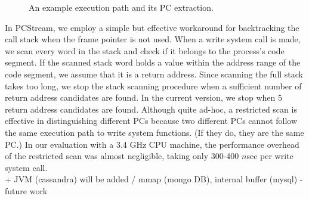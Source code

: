 \begin{figure}[b]
	\centering
	\hfill
	\caption{An example execution path and its PC extraction.} %
	\label{fig:getpc}
\end{figure}

In \textsf{\small PCStream}, we employ a simple but effective workaround 
for backtracking the call stack when the frame pointer is not used.
When a write system call is made, we scan every word in the stack and check
if it belongs to the process's code segment.  If the scanned stack word holds a
value within the address range of the code segment, we assume that it is a
return address.  Since scanning the full stack takes too long, we stop the
stack scanning procedure when a sufficient number of return address candidates
are found.  In the current version, we stop when 5 return address candidates
are found.  Although quite ad-hoc, a restricted scan is effective in
distinguishing different PCs because two different PCs
cannot follow the same execution path to write system functions.  
(If they do, they are the same PC.) In our evaluation
with a 3.4 GHz CPU machine, the performance overhead of the restricted scan was
almost negligible, taking only 300-400 $n$sec per write system call.
\\
+ JVM (cassandra) will be added /  mmap (mongo DB), internal buffer (mysql) - future work \\ \\

